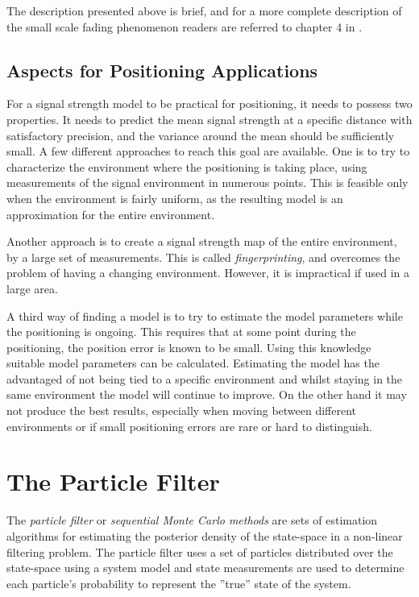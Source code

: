 \documentclass{LTHthesis}
\begin{document}
The description presented above is brief, and for a more complete description of the small scale fading phenomenon readers are referred to chapter 4 in \cite{rappaport96}.  
 \section{Aspects for Positioning Applications}
 \label{sec:AfPA}
 For a signal strength model to be practical for positioning, it needs to possess two properties. It needs to predict the mean signal strength at a specific distance with satisfactory precision, and the variance around the mean should be sufficiently small. A few different approaches to reach this goal are available. One is to try to characterize the environment where the positioning is taking place, using measurements of the signal environment in numerous points. This is feasible only when the environment is fairly uniform, as the resulting model is an approximation for the entire environment. 
 
 Another approach is to create a signal strength map of the entire environment, by a large set of measurements. This is called \emph{fingerprinting}, and overcomes the problem of having a changing environment. However, it is impractical if used in a large area. 
 
 A third way of finding a model is to try to estimate the model parameters while the positioning is ongoing. This requires that at some point during the positioning, the position error is known to be small. Using this knowledge suitable model parameters can be calculated. Estimating the model has the advantaged of not being tied to a specific environment and whilst staying in the same environment the model will continue to improve. On the other hand it may not produce the best results, especially when moving between different environments or if small positioning errors are rare or hard to distinguish.        
\chapter{The Particle Filter}
\label{chap:PF}
%
The \emph{particle filter} or \emph{sequential Monte Carlo methods} are sets of estimation algorithms for estimating the posterior density of the state-space in a non-linear filtering problem. The particle filter uses a set of particles distributed over the state-space using a system model and state measurements are used to determine each particle's probability to represent the ''true'' state of the system.  
\end{document}
